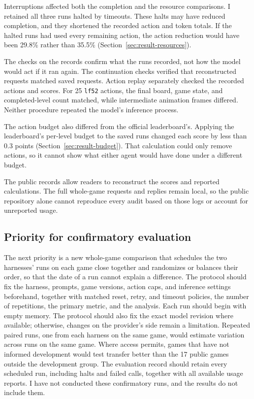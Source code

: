 Interruptions affected both the completion and the resource comparisons. I retained all three runs halted by timeouts. These halts may have reduced completion, and they shortened the recorded action and token totals. If the halted runs had used every remaining action, the action reduction would have been 29.8\% rather than 35.5\% (Section~\ref{sec:result-resources}).

The checks on the records confirm what the runs recorded, not how the model would act if it ran again. The continuation checks verified that reconstructed requests matched saved requests. Action replay separately checked the recorded actions and scores. For 25 \texttt{lf52} actions, the final board, game state, and completed-level count matched, while intermediate animation frames differed. Neither procedure repeated the model's inference process.

The action budget also differed from the official leaderboard's. Applying the leaderboard's per-level budget to the saved runs changed each score by less than 0.3 points (Section~\ref{sec:result-budget}). That calculation could only remove actions, so it cannot show what either agent would have done under a different budget.

The public records allow readers to reconstruct the scores and reported calculations. The full whole-game requests and replies remain local, so the public repository alone cannot reproduce every audit based on those logs or account for unreported usage.

\subsection{Priority for confirmatory evaluation}
The next priority is a new whole-game comparison that schedules the two harnesses' runs on each game close together and randomizes or balances their order, so that the date of a run cannot explain a difference. The protocol should fix the harness, prompts, game versions, action caps, and inference settings beforehand, together with matched reset, retry, and timeout policies, the number of repetitions, the primary metric, and the analysis. Each run should begin with empty memory. The protocol should also fix the exact model revision where available; otherwise, changes on the provider's side remain a limitation. Repeated paired runs, one from each harness on the same game, would estimate variation across runs on the same game. Where access permits, games that have not informed development would test transfer better than the 17 public games outside the development group. The evaluation record should retain every scheduled run, including halts and failed calls, together with all available usage reports. I have not conducted these confirmatory runs, and the results do not include them.

